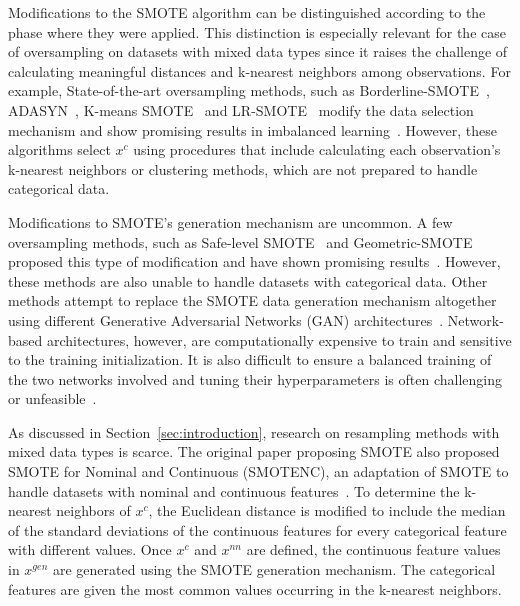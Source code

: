 \documentclass[preprint,12pt]{elsarticle}
\begin{document}
{Modifications to the SMOTE algorithm can be distinguished according to the
phase where they were applied. This distinction is especially relevant for the
case of oversampling on datasets with mixed data types since it raises the
challenge of calculating meaningful distances and k-nearest neighbors among
observations. For example, State-of-the-art oversampling methods, such as
Borderline-SMOTE~\cite{han2005borderline}, ADASYN~\cite{he2008adasyn}, K-means
SMOTE~\cite{douzas2018improving} and LR-SMOTE~\cite{liang2020lr} modify the
data selection mechanism and show promising results in imbalanced
learning~\cite{fonseca2021improving}. However, these algorithms select $x^c$
using procedures that include calculating each observation's k-nearest
neighbors or clustering methods, which are not prepared to handle categorical
data.

Modifications to SMOTE's generation mechanism are uncommon. A few oversampling
methods, such as Safe-level SMOTE~\cite{bunkhumpornpat2009safe} and
Geometric-SMOTE~\cite{douzas2019geometric} proposed this type of modification
and have shown promising results~\cite{douzas2019imbalanced}. However, these
methods are also unable to handle datasets with categorical data. Other
methods attempt to replace the SMOTE data generation mechanism altogether
using different Generative Adversarial Networks (GAN)
architectures~\cite{salazar2021generative, koivu2020synthetic, jo2022obgan}.
Network-based architectures, however, are computationally expensive to train
and sensitive to the training initialization. It is also difficult to ensure a
balanced training of the two networks involved and tuning their
hyperparameters is often challenging or unfeasible~\cite{gonog2019review}. 

As discussed in Section~\ref{sec:introduction}, research on resampling methods
with mixed data types is scarce. The original paper proposing SMOTE also
proposed SMOTE for Nominal and Continuous (SMOTENC), an adaptation of SMOTE to
handle datasets with nominal and continuous features~\cite{Chawla2002}. To
determine the k-nearest neighbors of $x^c$, the Euclidean distance is modified
to include the median of the standard
deviations of the continuous features for every categorical feature with
different values. Once $x^c$ and $x^{nn}$ are defined,  
the continuous feature values in $x^{gen}$ are generated using the SMOTE generation
mechanism. The categorical features are given the most common values
occurring in the k-nearest neighbors.

}
\end{document}

